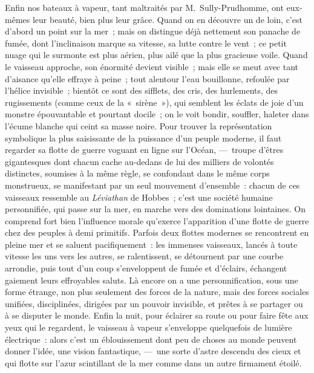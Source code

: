 \documentclass[french,twoside]{book} %
\begin{document}
Enfin nos bateaux à vapeur, tant maltraités par M. Sully-Prudhomme, ont eux-mêmes leur beauté, bien plus leur grâce. Quand on en découvre un de loin, c’est d’abord un point sur la mer ; mais on distingue déjà nettement son panache de fumée, dont l’inclinaison marque sa vitesse, sa lutte contre le vent ; ce petit nuage qui le surmonte est plus  aérien, plus ailé que la plus gracieuse voile. Quand le vaisseau approche, son énormité devient visible ; mais elle se meut avec tant d’aisance qu’elle effraye à peine ; tout alentour l’eau bouillonne, refoulée par l’hélice invisible ; bientôt ce sont des sifflets, des cris, des hurlements, des rugissements (comme ceux de la « sirène »), qui semblent les éclats de joie d’un monstre épouvantable et pourtant docile ; on le voit bondir, souffler, haleter dans l’écume blanche qui ceint sa masse noire. Pour trouver la représentation symbolique la plus saisissante de la puissance d’un peuple moderne, il faut regarder sa flotte de guerre voguant en ligne sur l’Océan, — troupe d’êtres gigantesques dont chacun cache au-dedans de lui des milliers de volontés distinctes, soumises à la même règle, se confondant dans le même corps monstrueux, se manifestant par un seul mouvement d’ensemble : chacun de ces vaisseaux ressemble au \emph{Léviathan} de Hobbes ; c’est une société humaine personnifiée, qui passe sur la mer, en marche vers des dominations lointaines. On comprend fort bien l’influence morale qu’exerce l’apparition d’une flotte de guerre chez des peuples à demi primitifs. Parfois deux flottes modernes se rencontrent en pleine mer et se saluent pacifiquement : les immenses vaisseaux, lancés à toute vitesse les uns vers les autres, se ralentissent, se détournent par une courbe arrondie, puis tout d’un coup s’enveloppent de fumée et d’éclairs, échangent gaiement leurs effroyables saluts. Là encore on a une personnification, sous une forme étrange, non plus seulement des forces de la nature, mais des forces sociales unifiées, disciplinées, dirigées par un pouvoir  invisible, et prêtes à se partager ou à se disputer le monde. Enfin la nuit, pour éclairer sa route ou pour faire fête aux yeux qui le regardent, le vaisseau à vapeur s’enveloppe quelquefois de lumière électrique : alors c’est un éblouissement dont peu de choses au monde peuvent donner l’idée, une vision fantastique, — une sorte d’astre descendu des cieux et qui flotte sur l’azur scintillant de la mer comme dans un autre firmament étoilé.
\end{document}
